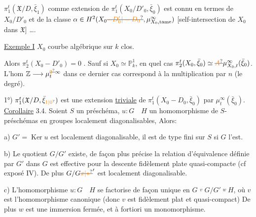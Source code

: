 
$\pi_1^t(\mathfrak X/D,\bar\xi_1)$ comme extension de $\pi_1^t(X_0/D'_0,\bar\xi_0)$
est connu  en termes de
$X_0/D'_0$ et de la classe $\alpha\in H^2(X_0\deleted{\unsure{-D'_0|-D_0}},\mu^\infty_{X_0,\mathrm{tame}})$
[self-intersection de $X_0$ dans $\mathfrak X$] \ldots.

\uline{Exemple I} $X_0$ courbe algébrique  sur $k$  clos.

Alors $\pi_2^t(X_0-D'_0)=0$ . Sauf si $X_0\simeq\mathbb P^1_k$, en quel
cas $\pi_2^t(X_0,\bar\xi_0)\simeq\deleted{\unsure{A}}\mu^\infty_{X_0,t}(\bar\xi_0)$. L'hom $\mathbb Z\longrightarrow\mu^{\deleted{\unsure{2}}\infty}_t$
dans ce dernier cas correspond  à la
multiplication par $n$ (le degré). 

1°)   $\pi_1^t(\mathfrak X/D,\bar\xi_{\unsure{1|0}})$ est une extension
\uline{triviale} de $\pi_1^t(X_0-D_0,\bar\xi_0)$ par $\mu^\infty_t(\bar\xi_0)$.
\uline{Corollaire} 3.4. Soient $S$ un préschéma, $u:G\quad H$ un homomorphisme
de  $S$-préschémas en groupes localement diagonalisables, Alors:

a) $G'=\operatorname{Ker}u$ est localement diagonalisable, il est de type fini sur $S$ si $G$ l'est.

b) Le quotient $G/G'$ existe, de façon plus précise la relation
d'équivalence définie par $G'$ dans $G$ est effective pour la descente
fidèlement plate quasi-compacte (cf exposé IV). De plus $G/G\deleted{\unsure{x|*}}'$ est
localement diagonalisable.

c)  L'homomorphisme $u:G\quad H$ se factorise
de façon unique en $G\overset v{\quad}G/G'\overset w{\quad}H$, où $v$ est l'homomorphisme
canonique (donc $v$ est fidèlement plat et quasi-compact) De plus
$w$ est une immersion fermée, et à fortiori un monomorphisme.

